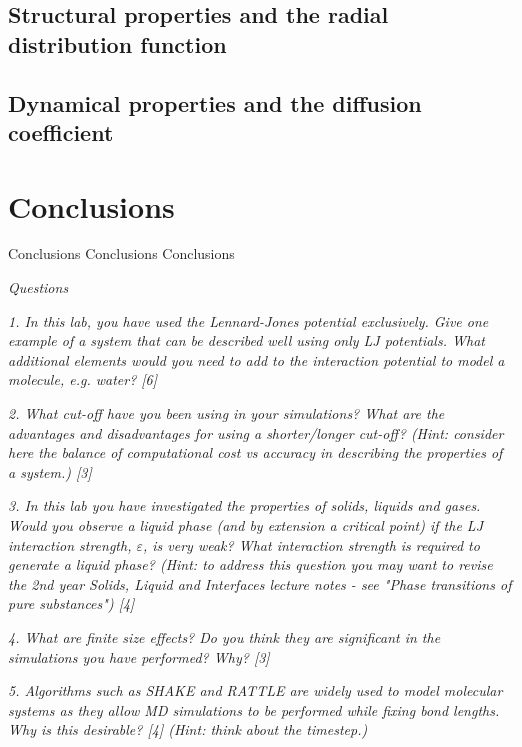 \documentclass[a4paper,10pt,twocolumn]{article}
\begin{document}
\subsection{Structural properties and the radial distribution function}

\subsection{Dynamical properties and the diffusion coefficient}
\section{Conclusions} %
Conclusions Conclusions Conclusions

\textit{Questions}

\textit{1. In this lab, you have used the Lennard-Jones potential exclusively. Give one example of a system that can be described well using only LJ potentials. What additional elements would you need to add to the interaction potential to model a molecule, e.g. water? [6]}

\textit{2. What cut-off have you been using in your simulations? What are the advantages and disadvantages for using a shorter/longer cut-off? (Hint: consider here the balance of computational cost vs accuracy in describing the properties of a system.) [3]}

\textit{3. In this lab you have investigated the properties of solids, liquids and gases. Would you observe a liquid phase (and by extension a critical point) if the LJ interaction strength, $\varepsilon$, is
very weak? What interaction strength is required to generate a liquid phase? (Hint: to address this question you may want to revise the 2nd year Solids, Liquid and Interfaces lecture notes - see "Phase transitions of pure substances") [4]}

\textit{4. What are finite size effects? Do you think they are significant in the simulations you have performed? Why? [3]}

\textit{5. Algorithms such as SHAKE and RATTLE are widely used to model molecular systems as they allow MD simulations to be performed while fixing bond lengths. Why is this desirable? [4] (Hint: think about the timestep.)}

    
{\small
\setlength{\bibsep}{0pt}


}
\end{document}
